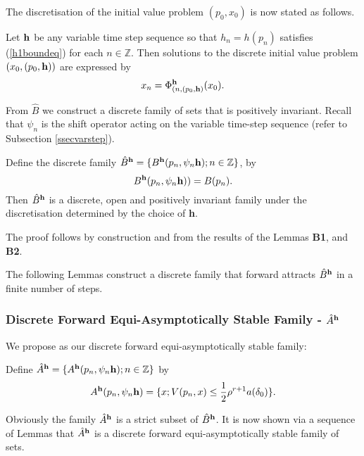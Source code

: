 The discretisation of the initial value problem $(p_0, x_0)$ is
now stated as follows.

Let ${\bf h}$ be any variable time step sequence so that $h_n =
h(p_n)$ satisfies (\ref{h1boundeq}) for each $n \in \mathbb{Z}$.
Then solutions to the discrete initial value problem $(x_0, (p_0, {\bf h}))$ are
expressed by
\begin{equation}
\label{divpdef}
 x_n = \Phi^{{\bf h}}_{(n,(p_0, {\bf h})}(x_0).
\end{equation}

From $\hat{B}$ we construct a discrete family of sets that is
positively invariant. Recall that $\psi_n$ is the shift operator acting on the variable time-step sequence (refer to Subsection \ref{ssecvarstep}).

\begin{lemma}[B3]
Define the discrete family $\hat{B}^{{\bf h}} = \{ B^{\bf h}(p_n, \psi_n{\bf
h}); n \in \mathbb{Z} \}$, by
\[ B^{\bf h}(p_n, \psi_n{\bf h})) = B(p_n). \]
Then $\hat{B}^{{\bf h}}$ is a discrete, open and positively invariant family
under the discretisation determined by the choice of {\bf h}.
\end{lemma}
\begin{prf}
  The proof follows by construction and from the results of the
  Lemmas \textbf{B1}, and \textbf{B2}.
\end{prf}

The following Lemmas construct a discrete
family that forward attracts $\hat{B}^{{\bf h}}$ in a finite
number of steps.

\subsubsection{Discrete Forward Equi-Asymptotically Stable
Family - $\hat{A}^{{\bf h}}$}

We propose as our discrete forward equi-asymptotically stable
family:

\begin{defn}[A1]
Define $\hat{A}^{{\bf h}} = \{ A^{\bf h}(p_n, \psi_n{\bf
h}); n \in \mathbb{Z} \}$ by
\[ A^{\bf h}(p_n, \psi_n{\bf h}) = \{x;V(p_n, x) \leq \frac{1}{2} \rho^{r+1}
                      a(\delta_0)  \}. \]
\end{defn}

Obviously the family $\hat{A}^{{\bf h}}$ is a strict subset of $\hat{B}^{{\bf h}}$.
It is now shown via a sequence of Lemmas that $\hat{A}^{{\bf h}}$ is a discrete
forward equi-asymptotically stable family of sets.


